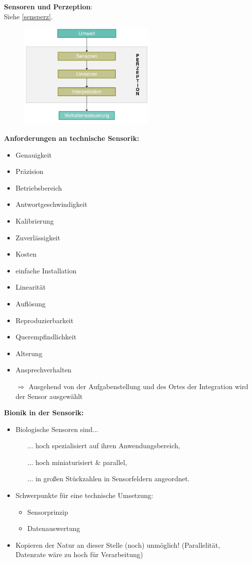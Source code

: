 \textbf{Sensoren und Perzeption}:\\
Siehe \autoref{sensperz}.
\begin{figure}[h!]
	\centering
	\includegraphics[width=0.6\textwidth]{figures/ch04_sensperz.png}
	\caption{}
	\label{sensperz}
\end{figure}
\textbf{Anforderungen an technische Sensorik:}
\begin{itemize}
\setlength\itemsep{0em}
\item Genauigkeit 
\item Präzision 
\item Betriebsbereich 
\item Antwortgeschwindigkeit 
\item Kalibrierung 
\item Zuverlässigkeit 
\item Kosten
\item einfache Installation
\item Linearität
\item Auflösung
\item Reproduzierbarkeit
\item Querempfindlichkeit
\item Alterung
\item Ansprechverhalten
\item[$\Rightarrow$] Ausgehend von der Aufgabenstellung und des Ortes der Integration wird der Sensor ausgewählt
\end{itemize}

\textbf{Bionik in der Sensorik:}
\begin{itemize}
\setlength\itemsep{0em}
\item Biologische Sensoren sind...
\begin{itemize}
\setlength\itemsep{0em}
\item[...] hoch spezialisiert auf ihren Anwendungsbereich,
\item[...] hoch miniaturisiert \& parallel,
\item[...] in großen \glqq Stückzahlen\grqq{} in Sensorfeldern angeordnet.
\end{itemize}
\item Schwerpunkte für eine technische Umsetzung:
\begin{itemize}
\setlength\itemsep{0em}
\item Sensorprinzip
\item Datenauswertung
\end{itemize}
\item Kopieren der Natur an dieser Stelle (noch) unmöglich! (Parallelität, Datenrate wäre zu hoch für Verarbeitung)
\end{itemize}
